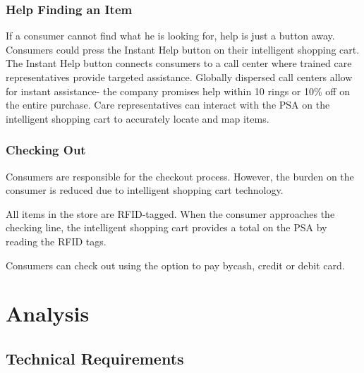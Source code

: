 \documentclass[a4paper,oneside,11pt,english]{report}
\begin{document}
	
	\subsection{Help Finding an Item}
	If a consumer cannot find what he is looking for, help is just a button away.  Consumers could press the Instant Help button on their intelligent shopping cart.  The Instant Help button connects consumers to a call center where trained care representatives provide targeted assistance.  Globally dispersed call centers allow for instant assistance- the company promises help within 10 rings or 10\% off on the entire purchase.  Care representatives can interact with the PSA on the intelligent shopping cart to accurately locate and map items. 
	
	
	\subsection{Checking Out}
	Consumers are responsible for the checkout process.  However, the burden on the consumer is reduced due to intelligent shopping cart technology. 
	\par All items in the store are RFID-tagged.  When the consumer approaches the checking line, the intelligent shopping cart provides a total on the PSA by reading the RFID tags.   
	\par Consumers can check out using the option to pay bycash, credit or debit card.   
	

\chapter{Analysis}

\section{Technical Requirements}
\end{document}
